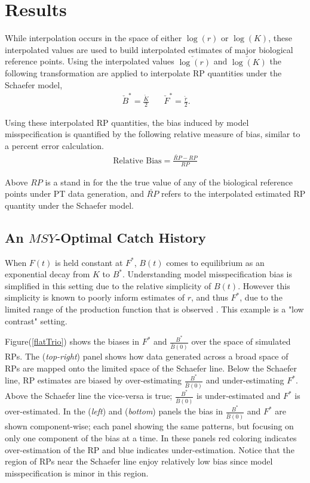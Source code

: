 \documentclass[12pt]{article}
\begin{document}
%
\clearpage
\section{Results}

%
While interpolation occurs in the space of either $\log(r)$ or $\log(K)$, these 
interpolated values are used to build interpolated estimates of major biological 
reference points. Using the interpolated values $\check{\log(r)}$ and $\check{\log(K)}$
the following transformation are applied to interpolate RP quantities under the Schaefer 
model,
%
\begin{align}~
        \check B^* = \frac{\check K}{2} ~~~~~~~~
	\check F^* = \frac{\check r}{2}.  %
\end{align}

%
Using these interpolated RP quantities, the bias induced by model misspecification is 
quantified by the following relative measure of bias, similar to a percent error calculation.
%
\begin{align}
\text{Relative Bias} = \frac{\check{RP}-RP}{RP}
\end{align}

%
Above $RP$ is a stand in for the the true value of any of the biological 
reference points under PT data generation, and $\check{RP}$ refers to the 
interpolated estimated RP quantity under the Schaefer model.

\subsection{An $MSY$-Optimal Catch History \label{flat}}

%
When $F(t)$ is held constant at $F^*$, $B(t)$ comes to equilibrium as an 
exponential decay from $K$ to $B^*$. Understanding model misspecification bias 
is simplified in this setting due to the relative simplicity of $B(t)$. 
However this simplicity is known to poorly inform estimates of $r$, and thus $F^*$, 
due to the limited range of the production function that is observed . 
This example is a "low contrast" setting.

%
Figure(\ref{flatTrio}) shows the biases in $F^*$ and $\frac{B^*}{\bar B(0)}$ 
over the space of simulated RPs. The (\emph{top-right}) panel shows how data 
generated across a broad space of RPs are mapped onto the limited space of 
the Schaefer line. Below the Schaefer line, RP estimates are biased by 
over-estimating $\frac{B^*}{\bar B(0)}$ and under-estimating $F^*$. Above the 
Schaefer line the vice-versa is true; $\frac{B^*}{\bar B(0)}$ is under-estimated 
and $F^*$ is over-estimated. In the (\emph{left}) and (\emph{bottom}) panels the bias 
in $\frac{B^*}{\bar B(0)}$ and $F^*$ are shown component-wise; each panel showing 
the same patterns, but focusing on only one component of the bias at a time. In 
these panels red coloring indicates over-estimation of the RP and blue indicates 
under-estimation. Notice that the region of RPs near the Schaefer line enjoy 
relatively low bias since model misspecification is minor in this region.  
\end{document}
